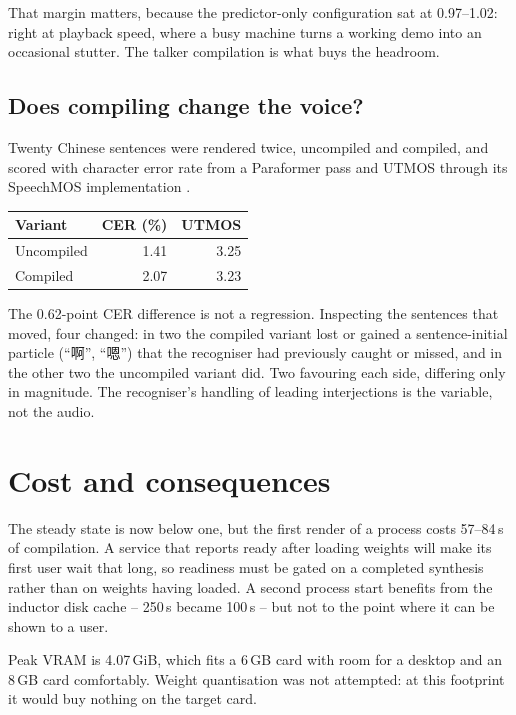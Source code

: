 \documentclass[11pt]{article}
\begin{document}
That margin matters, because the predictor-only configuration sat at 0.97--1.02: right at playback speed, where a
busy machine turns a working demo into an occasional stutter. The talker compilation is what buys the headroom.

\subsection{Does compiling change the voice?}

Twenty Chinese sentences were rendered twice, uncompiled and compiled, and scored with character error rate from a
Paraformer pass and UTMOS \cite{utmos} through its SpeechMOS implementation \cite{speechmos}.

\begin{center}
\begin{tabular}{lrr}
\toprule
Variant & CER (\%) & UTMOS \\
\midrule
Uncompiled & 1.41 & 3.25 \\
Compiled & 2.07 & 3.23 \\
\bottomrule
\end{tabular}
\end{center}

The 0.62-point CER difference is not a regression. Inspecting the sentences that moved, four changed: in two the
compiled variant lost or gained a sentence-initial particle (``啊'', ``嗯'') that the recogniser had previously
caught or missed, and in the other two the uncompiled variant did. Two favouring each side, differing only in
magnitude. The recogniser's handling of leading interjections is the variable, not the audio.

\section{Cost and consequences}

The steady state is now below one, but the first render of a process costs 57--84\,s of compilation. A service that
reports ready after loading weights will make its first user wait that long, so readiness must be gated on a
completed synthesis rather than on weights having loaded. A second process start benefits from the inductor disk
cache -- 250\,s became 100\,s -- but not to the point where it can be shown to a user.

Peak VRAM is 4.07\,GiB, which fits a 6\,GB card with room for a desktop and an 8\,GB card comfortably. Weight
quantisation was not attempted: at this footprint it would buy nothing on the target card.
\end{document}
